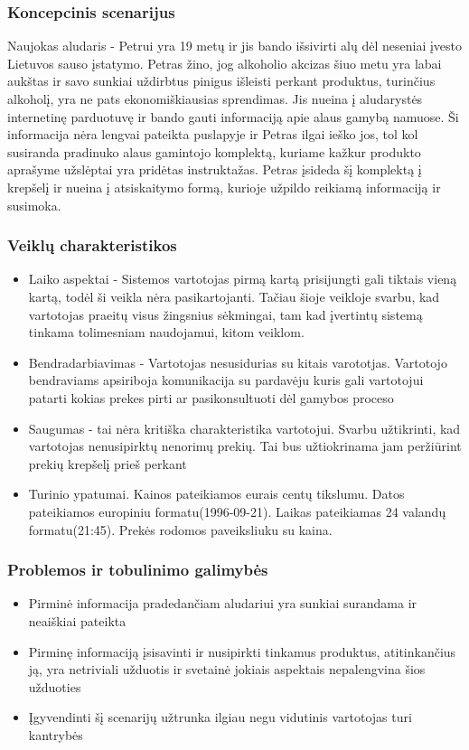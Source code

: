 \documentclass[oneside]{VUMIFPSkursinis}
\begin{document}
		\subsubsection{Koncepcinis scenarijus}
			Naujokas aludaris - Petrui yra 19 metų ir jis bando išsivirti alų dėl neseniai įvesto Lietuvos sauso įstatymo.
			Petras žino, jog alkoholio akcizas šiuo metu yra labai aukštas ir savo sunkiai uždirbtus pinigus išleisti perkant produktus, turinčius alkoholį, yra ne pats ekonomiškiausias sprendimas.
			Jis nueina į aludarystės internetinę parduotuvę ir bando gauti informaciją apie alaus gamybą namuose.
			Ši informacija nėra lengvai pateikta puslapyje ir Petras ilgai ieško jos, tol kol susiranda pradinuko alaus gamintojo komplektą, kuriame kažkur produkto aprašyme užslėptai yra pridėtas instruktažas.
			Petras įsideda šį komplektą į krepšelį ir nueina į atsiskaitymo formą, kurioje užpildo reikiamą informaciją ir susimoka.
		\subsubsection{Veiklų charakteristikos}
			\begin{itemize}
				\item{Laiko aspektai - Sistemos vartotojas pirmą kartą prisijungti gali tiktais vieną kartą, todėl ši veikla nėra pasikartojanti.
					Tačiau šioje veikloje svarbu, kad vartotojas praeitų visus žingsnius sėkmingai, tam kad įvertintų sistemą tinkama tolimesniam naudojamui, kitom veiklom. }
				\item{Bendradarbiavimas - Vartotojas nesusidurias su kitais varototjas. 
					Vartotojo bendraviams apsiriboja komunikacija su pardavėju kuris gali vartotojui patarti kokias prekes pirti ar pasikonsultuoti dėl gamybos proceso}
				\item{Saugumas - tai nėra kritiška charakteristika vartotojui. 
					Svarbu užtikrinti, kad vartotojas nenusipirktų nenorimų prekių. 
					Tai bus užtiokrinama jam peržiūrint prekių krepšelį prieš perkant}
				\item{Turinio ypatumai.}
					Kainos pateikiamos eurais centų tikslumu.
					Datos pateikiamos europiniu formatu(1996-09-21).
					Laikas pateikiamas 24 valandų formatu(21:45).
					Prekės rodomos paveiksliuku su kaina.	
			\end{itemize}
		\subsubsection{Problemos ir tobulinimo galimybės}
			\begin{itemize}
				\item{Pirminė informacija pradedančiam aludariui yra sunkiai surandama ir neaiškiai pateikta}
 				\item{Pirminę informaciją įsisavinti ir nusipirkti tinkamus produktus, atitinkančius ją, yra netriviali užduotis ir svetainė jokiais aspektais nepalengvina šios užduoties}
 				\item{Įgyvendinti šį scenarijų užtrunka ilgiau negu vidutinis vartotojas turi kantrybės}
			\end{itemize}
\end{document}
